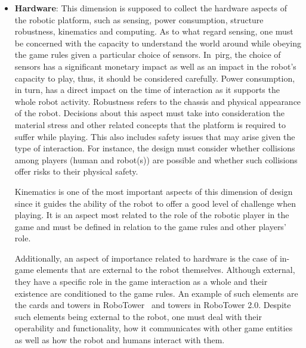 \begin{itemize}[leftmargin=*,labelsep=5.8mm]
\item \textbf{Hardware}: This dimension is supposed to collect the hardware aspects of the robotic platform, such as sensing, power consumption, structure robustness, kinematics and computing. As to what regard sensing, one must be concerned with the capacity to understand the world around while obeying the game rules given a particular choice of sensors. In~\gls{pirg}, the choice of sensors has a significant monetary impact as well as an impact in the robot's capacity to play, thus, it should be considered carefully. Power consumption, in turn, has a direct impact on the time of interaction as it supports the whole robot activity. Robustness refers to the chassis and physical appearance of the robot. Decisions about this aspect must take into consideration the material stress and other related concepts that the platform is required to suffer while playing. This also includes safety issues that may arise given the type of interaction. For instance, the design must consider whether collisions among players (human and robot(s)) are possible and whether such collisions offer risks to their physical safety. 

Kinematics is one of the most important aspects of this dimension of design since it guides the ability of the robot to offer a good level of challenge when playing. It is an aspect most related to the role of the robotic player in the game and must be defined in relation to the game rules and other players' role. 

Additionally, an aspect of importance related to hardware is the case of in-game elements that are external to the robot themselves. Although external, they have a specific role in the game interaction as a whole and their existence are conditioned to the game rules. An example of such elements are the cards and towers in RoboTower~\citep{bonarini_timing_2014} and towers in RoboTower 2.0. Despite such elements being external to the robot, one must deal with their operability and functionality, how it communicates with other game entities as well as how the robot and humans interact with them.


\end{itemize}
